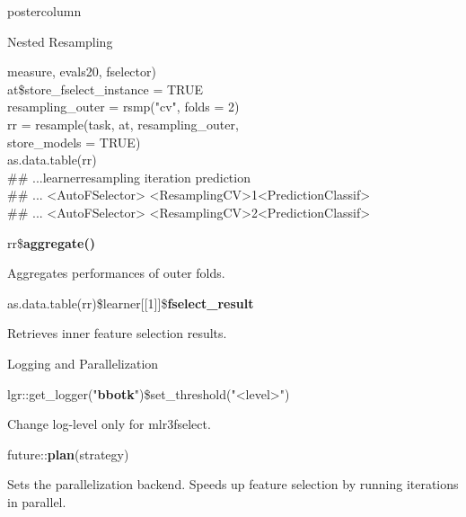\documentclass{beamer}
\newcommand{\monospace}[1]{\multido{}{#1}{\space}}
\begin{document}
\begin{frame}[fragile]{}
\begin{columns}
\begin{column}{.245\textwidth}
\begin{beamercolorbox}[center]{postercolumn}
\begin{minipage}{.98\textwidth}
{\begin{myblock}{Nested Resampling}
\begin{codeboxexample}
{									\hspace*{1ex}measure, evals20, fselector) \\
									at\$store\_fselect\_instance = TRUE
									\vspace{1em}
									\\
									resampling\_outer = rsmp("cv", folds = 2)\\
									rr = resample(task, at, resampling\_outer, \\
									\hspace*{1ex}store\_models = TRUE)
									\vspace{1em}
									\\
									as.data.table(rr)\\
									\#\# ...\monospace{8}learner\monospace{5}resampling iteration
									\monospace{13}prediction\\
									\#\# ... <AutoFSelector> <ResamplingCV>\monospace{9}1\monospace{5}<PredictionClassif>\\
									\#\# ... <AutoFSelector> <ResamplingCV>\monospace{9}2\monospace{5}<PredictionClassif>}
							\end{codeboxexample}
							\vspace{1em}
							\begin{codebox}
								rr\$\textbf{aggregate()}
							\end{codebox}
							Aggregates performances of outer folds.
							\\
							\begin{codebox}
								\footnotesize{as.data.table(rr)\$learner[[1]]\$\textbf{fselect\_result}}
							\end{codebox}
							Retrieves inner feature selection results.
							\vspace{-0.5em}
						\end{myblock}
						\begin{myblock}{Logging and Parallelization}
							\begin{codebox}
								{\scriptsize
									lgr::get\_logger("\textbf{bbotk}")\$set\_threshold("<level>")}
							\end{codebox}
							Change log-level only for mlr3fselect.\\
							\begin{codebox}
								future::\textbf{plan}(strategy)
							\end{codebox}
							Sets the parallelization backend.
							Speeds up feature selection by running iterations in parallel.
						\end{myblock}
						\vfill}
				\end{minipage}
			\end{beamercolorbox}
		\end{column}
	\end{columns}
\end{frame}
\end{document}
